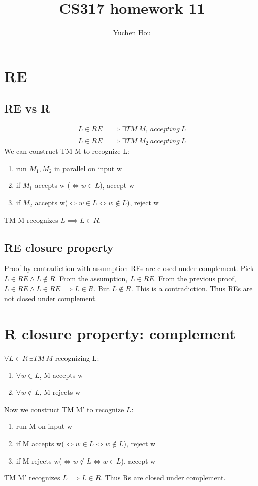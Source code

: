 \documentclass{article}
\begin{document}
\lstset{language=Java}
\title{CS317 homework 11}
\author{Yuchen Hou}
\maketitle

\section{RE}
\subsection{RE vs R}
\begin{align*}
L \in RE &\implies \exists TM \ M_1 \ accepting \ L \\
\overline{L} \in RE &\implies \exists TM \ M_2 \ accepting \ \overline{L}
\end{align*}
We can construct TM M to recognize L:
\begin{enumerate}
  \item run $M_1, M_2$ in parallel on input w
  \item if $M_1 $ accepts w ($\iff w \in L$), accept w
  \item if $M_2$ accepts w($\iff w \in \overline{L} \iff w \notin L $),
  reject w
\end{enumerate}
TM M recognizes $L \implies L \in R$.
\subsection{RE closure property}
Proof by contradiction with assumption REs are closed under complement. Pick
$L \in RE \land L\notin R$. From the assumption, $\overline{L} \in
RE$. From the previous proof, $L \in RE \land \overline{L} \in RE \implies L
\in R$. But $L\notin R$. This is a contradiction. Thus REs are not closed
under complement.

\section{R closure property: complement}
$\forall L \in R \ \exists TM \ M$ recognizing L:
\begin{enumerate}
  \item $\forall w \in L$, M accepts w
  \item $\forall w \notin L$, M rejects w
\end{enumerate}
Now we construct TM M' to recognize $\overline{L}$:
\begin{enumerate}
  \item run M on input w
  \item if M accepts w($\iff w \in L \iff w \notin \overline{L}$), reject w
  \item if M rejects w($\iff w \notin L \iff w \in \overline{L}$), accept w
\end{enumerate}
TM M' recognizes $\overline{L} \implies \overline{L} \in R$. Thus Rs are closed
under complement.
\end{document}
